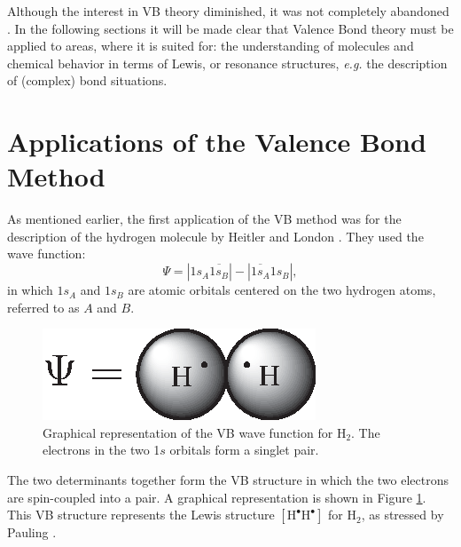 Although the interest in VB theory diminished, it was not completely abandoned \cite{vboverv1,vboverv2,vboverv3}. In the following sections it will be made clear that Valence Bond theory must be applied to areas, where it is suited for: the understanding of molecules and chemical behavior in terms of Lewis, or resonance structures, \textit{e.g.} the description of (complex) bond situations.

\section{Applications of the Valence Bond Method}

As mentioned earlier, the first application of the VB method was for the description of the hydrogen molecule by Heitler and London \cite{heitler}. They used the wave function:
\begin{equation}
\Psi = |1s_{A}\overline{1s_{B}}| - |\overline{1s_{A}}1s_{B}|,
\label{ch1.eq.hl}
\end{equation}
in which $1s_{A}$ and $1s_{B}$ are atomic orbitals centered on the two hydrogen atoms, referred to as $A$ and $B$.
\begin{figure}[htdp]
\center
\includegraphics[scale=1]{introduction/figures/heitler.eps}
\caption{Graphical representation of the VB wave function for $\mathrm{H_2}$. The electrons in the two 1$s$ orbitals form a singlet pair.}
\label{ch1.fig.heitler}
\end{figure}
The two determinants together form the VB structure in which the two electrons are spin-coupled into a pair. A graphical representation is shown in Figure \ref{ch1.fig.heitler}. This VB structure represents the Lewis structure $\mathrm{[H^\bullet H^\bullet]}$ for H$_2$, as stressed by Pauling \cite{hllewis}. 

